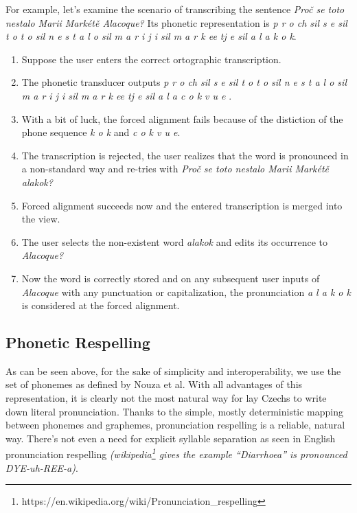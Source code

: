 \documentclass{itatnew}
\begin{document}
For example, let's examine the scenario of transcribing the sentence {\em Proč
se toto nestalo Marii Markétě Alacoque?} Its phonetic representation is {\em p r
o ch sil s e sil t o t o sil n e s t a l o sil m a r i j i sil m a r k ee tj e
sil a l a k o k}.
\begin{enumerate}
\item{Suppose the user enters the correct ortographic transcription.}
\item{
    The phonetic transducer outputs {\em
        p r o ch sil
        s e sil
        t o t o sil
        n e s t a l o sil
        m a r i j i sil
        m a r k ee tj e sil
        a l a c o k v u e
    }.
}
\item{
    With a bit of luck, the forced alignment fails because of the distiction of
    the phone sequence {\em k o k} and {\em c o k v u e}.
}
\item{
    The transcription is rejected, the user realizes that the word is pronounced
    in a non-standard way and re-tries with
    {\em Proč se toto nestalo Marii Markétě alakok?}
}
\item{
    Forced alignment succeeds now and the entered transcription is merged into
    the view.
}
\item{
    The user selects the non-existent word {\em alakok} and edits its occurrence
    to {\em Alacoque?}
}
\item{
    Now the word is correctly stored and on any subsequent user inputs of {\em
    Alacoque} with any punctuation or capitalization, the pronunciation
    {\em a l a k o k} is considered at the forced alignment.
}
\end{enumerate}

\subsection{Phonetic Respelling}
\label{subsec:respelling}

As can be seen above, for the sake of simplicity and interoperability, we use
the set of phonemes as defined by Nouza et al.\cite{nouza1997phonetic} With all
advantages of this representation, it is clearly not the most natural way for
lay Czechs to write down literal pronunciation. Thanks to the simple, mostly
deterministic mapping between phonemes and graphemes, pronunciation respelling
is a reliable, natural way. There's not even a need for explicit syllable
separation as seen in English pronunciation respelling {\em
(wikipedia\footnote{https://en.wikipedia.org/wiki/Pronunciation\_respelling}
gives the example {\em ``Diarrhoea'' is pronounced DYE-uh-REE-a})}.
\end{document}
